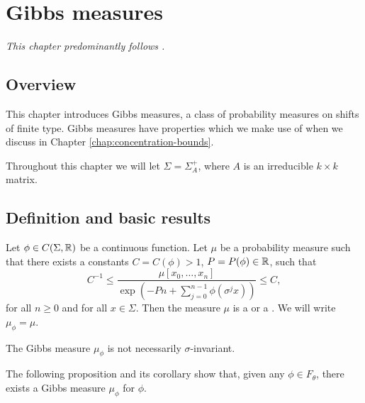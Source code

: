 \chapter{Gibbs measures}
\emph{This chapter predominantly follows \cite[p36-47]{parry-pollicott:zeta-fns-periodic-orbits}.}

\section{Overview}
This chapter introduces Gibbs measures, a class of probability measures on shifts of finite type. Gibbs measures have properties which we make use of when we discuss \cite{chazottes-maldonado:cbfee} in Chapter \ref{chap:concentration-bounds}.

Throughout this chapter we will let $\Sigma = \Sigma_A^+$, where $A$ is an irreducible $k \times k$ matrix.

\section{Definition and basic results}

\begin{definition}
	Let $\phi \in C(\Sigma, \mathbb{R})$ be a continuous function. Let $\mu$ be a probability measure such that there exists a constants $C = C(\phi) > 1$, $P = P(\phi) \in \mathbb{R}$, such that
	\begin{equation}
		C^{-1} \leq \frac{\mu[x_0, \dots, x_n]}{\exp\left(-Pn + \sum_{j = 0}^{n - 1}{\phi(\sigma^j{x})} \right)} \leq C,
	\end{equation}
	for all $n \geq 0$ and for all $x \in \Sigma$. Then the measure $\mu$ is a  or a . We will write $\mu_\phi = \mu$.
\end{definition}

\begin{remark}
	The Gibbs measure $\mu_\phi$ is not necessarily $\sigma$-invariant.
\end{remark}

The following proposition and its corollary show that, given any $\phi \in F_\theta$, there exists a Gibbs measure $\mu_\phi$ for $\phi$.

